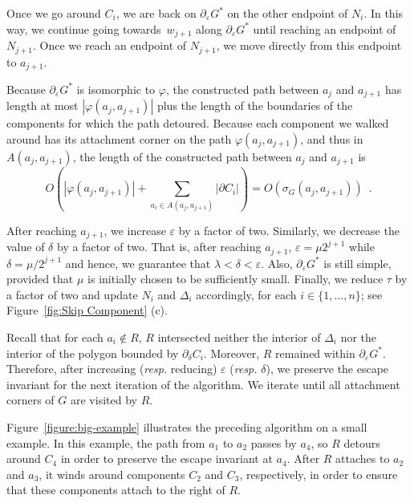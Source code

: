 \documentclass[11pt]{patmorin}
\begin{document}
Once we go around $C_i$, we are back on $\partial_\varepsilon G^*$ on the other endpoint of $N_i$. In this way, we continue going towards~$w_{j+1}$ along $\partial_\varepsilon G^*$ until reaching an endpoint of $N_{j+1}$.
Once we reach an endpoint of $N_{j+1}$, we move directly from this endpoint to $a_{j+1}$.

Because $\partial_\varepsilon G^*$ is isomorphic to $\varphi$, the constructed path between $a_j$ and $a_{j+1}$ has length at most $|\varphi(a_j, a_{j+1})|$ plus the length of the boundaries of the components for which the path detoured. Because each component we walked around has its attachment corner on the path $\varphi(a_j, a_{j+1})$, and thus in $A(a_j, a_{j+1})$, the length of the constructed path between $a_j$ and $a_{j+1}$ is
\[ O\left(|\varphi(a_j, a_{j+1})| + \sum_{a_i\in A(a_j, a_{j+1})} |\partial C_i|\right) = O(\sigma_G(a_j, a_{j+1})) \enspace .
\]

After reaching $a_{j+1}$, we increase $\varepsilon$ by a factor of two. Similarly, we decrease the value of $\delta$ by a factor of two. That is, after reaching $a_{j+1}$, $\varepsilon = \mu 2^{j+1}$ while $\delta = \mu/2^{j+1}$ and hence, we guarantee that $\lambda < \delta < \varepsilon$.
Also, $\partial_\varepsilon G^*$ is still simple, provided that $\mu$ is initially chosen to be sufficiently small.
Finally, we reduce $\tau$ by a factor of two and update $N_i$ and $\Delta_i$ accordingly, for each $i\in \{1,\dots,n\}$; see Figure~\ref{fig:Skip Component} (c).

Recall that for each $a_i\notin R$, $R$ intersected neither the interior of $\Delta_i$ nor the interior of the polygon bounded by $\partial_\delta C_i$. Moreover, $R$ remained within $\partial_\varepsilon G^*$.
Therefore, after increasing (\emph{resp.} reducing) $\varepsilon$ (\emph{resp.} $\delta$), we preserve the escape invariant for the next iteration of the algorithm.
We iterate until all attachment corners of $G$ are visited by $R$.

Figure~\ref{figure:big-example} illustrates the preceding algorithm on a small example.  In this example, the path from $a_1$ to $a_2$ passes by $a_4$, so $R$ detours around $C_4$ in order to preserve the escape invariant at $a_4$.  After $R$ attaches to $a_2$ and $a_3$, it winds around components $C_2$ and $C_3$, respectively, in order to ensure that these components attach to the right of $R$.
\end{document}

